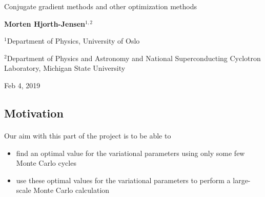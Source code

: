 \documentclass[%
oneside,                 %
final,                   %
10pt]{article}
\begin{document}

\newcommand{\exercisesection}[1]{\subsection*{#1}}







\thispagestyle{empty}

\begin{center}
{\LARGE\bf
\begin{spacing}{1.25}
Conjugate gradient methods and other optimization methods
\end{spacing}
}
\end{center}


\begin{center}
{\bf Morten Hjorth-Jensen${}^{1, 2}$} \\ [0mm]
\end{center}

\begin{center}
\centerline{{\small ${}^1$Department of Physics, University of Oslo}}
\centerline{{\small ${}^2$Department of Physics and Astronomy and National Superconducting Cyclotron Laboratory, Michigan State University}}
\end{center}
    

\begin{center}
Feb 4, 2019
\end{center}

\vspace{1cm}


\subsection{Motivation}

\paragraph{}
Our aim with this part of the project is to be able to
\begin{itemize}
\item find an optimal value for the variational parameters using only some few Monte Carlo cycles

\item use these optimal values for the variational parameters to perform a large-scale Monte Carlo calculation
\end{itemize}
\end{document}
